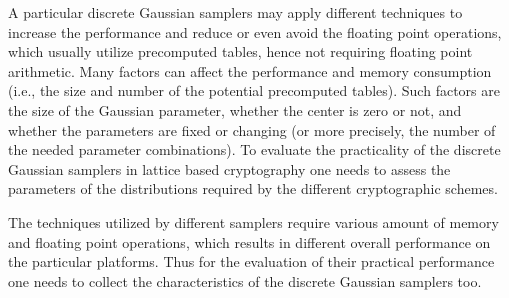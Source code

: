 A particular discrete Gaussian samplers may apply different techniques to increase the performance and reduce or even avoid the floating point operations, which usually utilize precomputed tables, hence not requiring floating point arithmetic. Many factors can affect the performance and memory consumption (i.e., the size and number of the potential precomputed tables). Such factors are the size of the Gaussian parameter, whether the center is zero or not, and whether the parameters are fixed or changing (or more precisely, the number of the needed parameter combinations). To evaluate the practicality of the discrete Gaussian samplers in lattice based cryptography one needs to assess the parameters of the distributions required by the different cryptographic
schemes.

The techniques utilized by different samplers require various amount of memory and floating point operations, which results in different overall performance on the particular platforms. Thus for the evaluation of their practical performance one needs to collect the characteristics of the discrete Gaussian samplers too.




